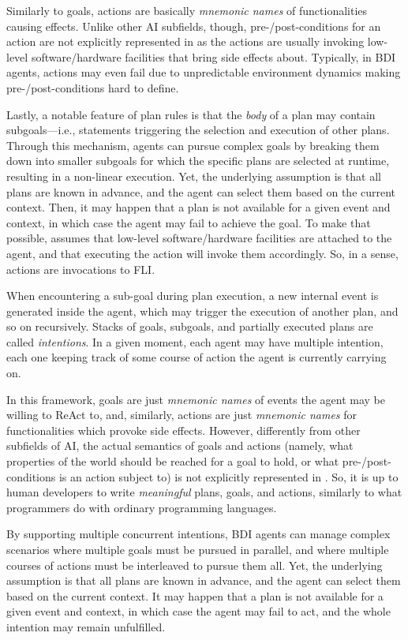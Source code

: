 \documentclass[12pt,a4paper,openright,twoside]{book}
\begin{document}
Similarly to goals, actions are basically \emph{mnemonic names} of functionalities causing effects.
%
Unlike other \ac{AI} subfields, though, pre-/post-conditions for an action are not explicitly represented in \agentspeak{} as the actions are usually invoking low-level software/hardware facilities that bring side effects about.
%
Typically, in \ac{BDI} agents, actions may even fail due to unpredictable environment dynamics making pre-/post-conditions hard to define.

Lastly, a notable feature of \agentspeak{} plan rules is that the \emph{body} of a plan may contain subgoals---i.e., statements triggering the selection and execution of other plans.
%
Through this mechanism, \agentspeak{} agents can pursue complex goals by breaking them down into smaller subgoals for which the specific plans are selected at runtime, resulting in a non-linear execution.
%
Yet, the underlying assumption is that all plans are known in advance, and the agent can select them based on the current context.
%
Then, it may happen that a plan is not available for a given event and context, in which case the agent may fail to achieve the goal.
%
To make that possible, \agentspeak{} assumes that low-level software/hardware facilities are attached to the agent, and that executing the action will invoke them accordingly.
%
So, in a sense, actions are invocations to \ac{FLI}.

When encountering a sub-goal during plan execution, a new internal event is generated inside the agent, which may trigger the execution of another plan, and so on recursively.
%
Stacks of goals, subgoals, and partially executed plans are called \emph{intentions}.
%
In a given moment, each agent may have multiple intention, each one keeping track of some course of action the agent is currently carrying on.

In this framework, goals are just \emph{mnemonic names} of events the agent may be willing to \ac{ReAct} to, and, similarly, actions are just \emph{mnemonic names} for functionalities which provoke side effects.
%
However, differently from other subfields of \ac{AI}, the actual semantics of goals and actions
(namely, what properties of the world should be reached for a goal to hold, or what pre-/post-conditions is an action subject to) is not explicitly represented in \agentspeak{}.
%
So, it is up to human developers to write \emph{meaningful} plans, goals, and actions, similarly to what programmers do with ordinary programming languages.

By supporting multiple concurrent intentions, \ac{BDI} agents can manage complex scenarios where multiple goals must be pursued in parallel, and where multiple courses of actions must be interleaved to pursue them all.
%
Yet, the underlying assumption is that all plans are known in advance, and the agent can select them based on the current context.
%
It may happen that a plan is not available for a given event and context, in which case the agent may fail to act, and the whole intention may remain unfulfilled.
\end{document}
